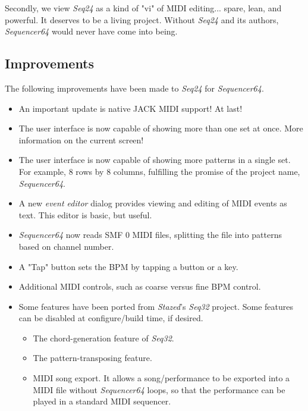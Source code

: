 \documentclass[
 11pt,
 twoside,
 a4paper,
 headinclude,
 footinclude,
 final                                 %
]{article}
\begin{document}
   Secondly, we view \textsl{Seq24} as a kind of "vi" of MIDI editing... spare,
   lean, and powerful.  It deserves to be a living project.  Without
   \textsl{Seq24} and its authors, \textsl{Sequencer64} would never have come
   into being.

\subsection{Improvements}
\label{subsec:improvements}

   The following improvements have been made to \textsl{Seq24} for
   \textsl{Sequencer64}.

   \begin{itemize}
      \item An important update is native JACK MIDI support!  At last!
      \item The user interface is now capable of showing more than one set at
         once.  More information on the current screen!
      \item The user interface is now capable of showing more patterns in a
         single set.  For example, 8 rows by 8 columns, fulfilling the promise
         of the project name, \textsl{Sequencer64}.
      \item A new \textsl{event editor} dialog
         provides viewing and editing of MIDI events as text.
         This editor is basic, but useful.
      \item \textsl{Sequencer64} now reads SMF 0 MIDI files, splitting
         the file into patterns based on channel number.
      \item A "Tap" button sets the BPM by tapping a button or a key.
      \item Additional MIDI controls, such as coarse versus fine BPM control.
      \item Some features have been ported from \textsl{Stazed}'s
      \textsl{Seq32} \cite{seq32} project.  Some features can be disabled at
      configure/build time, if desired.
      \begin{itemize}
         \item The chord-generation feature of \textsl{Seq32}.
         \item The pattern-transposing feature.
         \item MIDI song export.
            It allows a song/performance to be exported into a MIDI file
            without \textsl{Sequencer64} loops, so that the performance can be
            played in a standard MIDI sequencer.

\end{itemize}
\end{itemize}
\end{document}
